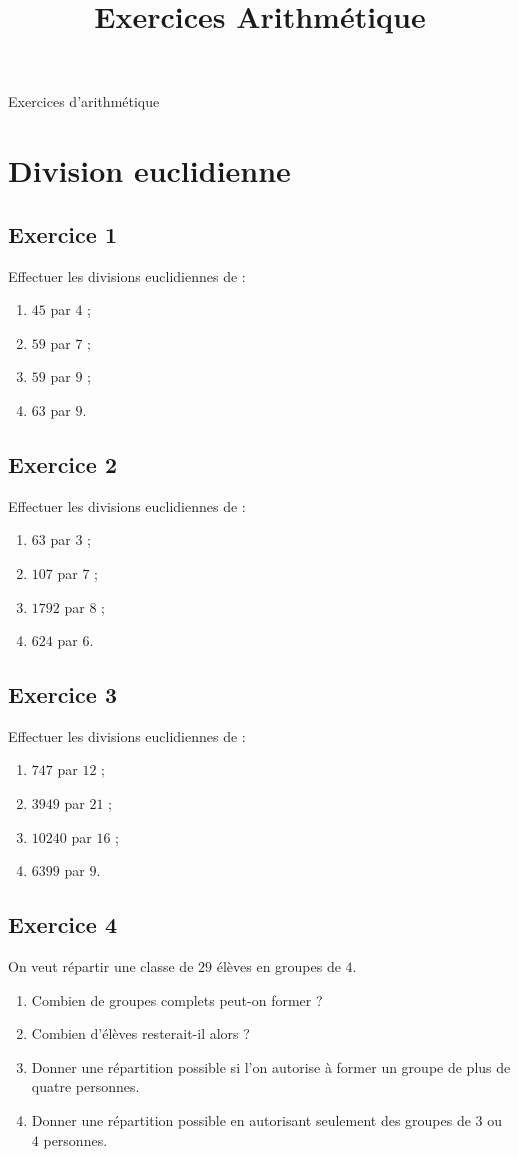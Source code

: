 \documentclass[12 pt]{article}
\title{Exercices Arithmétique}
\date{}
\theoremstyle{plain}
\newcounter{n}
\numberwithin{n}{section}
\begin{document}
\begin{center}{\Large Exercices d'arithmétique}\\ 
 \end{center} 
\section*{Division euclidienne}

\subsection*{Exercice 1}

Effectuer les divisions euclidiennes de : \begin{enumerate}
\item $45$ par $4$ ; 
\item $59$ par $7$ ; 
\item $59$ par $9$ ; 
\item $63$ par $9$.
\end{enumerate}

\subsection*{Exercice 2}

Effectuer les divisions euclidiennes de : \begin{enumerate}
\item $63$ par $3$ ; 
\item $107$ par $7$ ; 
\item $1792$ par $8$ ; 
\item $624$ par $6$.
\end{enumerate}

\subsection*{Exercice 3}

Effectuer les divisions euclidiennes de : \begin{enumerate}
\item $747$ par $12$ ; 
\item $3949$ par $21$ ; 
\item $10240$ par $16$ ; 
\item $6399$ par $9$.
\end{enumerate}

\subsection*{Exercice 4}
On veut répartir une classe de $29$ élèves en groupes de $4$. \begin{enumerate}
\item Combien de groupes complets peut-on former ? 
\item Combien d'élèves resterait-il alors ? 
\item Donner une répartition possible si l'on autorise à former un groupe de plus de quatre personnes. 
\item Donner une répartition possible en autorisant seulement des groupes de $3$ ou $4$ personnes. 
\end{enumerate}
\end{document}
